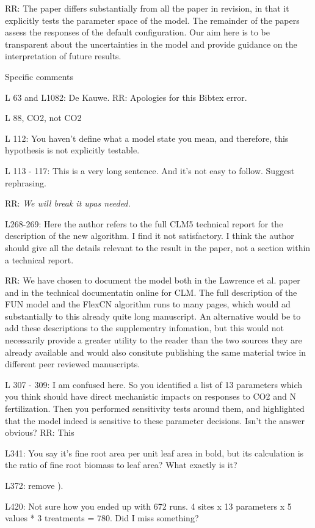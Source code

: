 \documentclass{article}
\begin{document}
RR: The paper differs substantially from all the paper in revision, in that it explicitly tests the parameter space of the model.  The remainder of the papers assess the responses of the default configuration. Our aim here is to be transparent about the uncertainties in the model and provide guidance on the interpretation of future results. 

Specific comments 

L 63 and L1082: De Kauwe. 
RR: Apologies for this Bibtex error. 

L 88, CO2, not CO2 

L 112: You haven't define what a model state you mean, and therefore, this hypothesis is not explicitly testable. 

L 113 - 117: This is a very long sentence. And it's not easy to follow. Suggest rephrasing.

RR:\emph{ We will break it upas needed. }

L268-269: Here the author refers to the full CLM5 technical report for the description of the new algorithm. I find it not satisfactory. I think the author should give all the details relevant to the result in the paper, not a section within a technical report. 

RR: We have chosen to document the model both in the Lawrence et al. paper and in the technical documentatin online for CLM. The full description of the FUN model and the FlexCN algorithm runs to many pages, which would ad substantially to this already quite long manuscript. An alternative would be to add these descriptions to the supplementry infomation, but this would not necessarily provide a greater utility to the reader than the two sources they are already available and would also consitute publishing the same material twice in different peer reviewed manuscripts. 

L 307 - 309: I am confused here. So you identified a list of 13 parameters which you think should have direct mechanistic impacts on responses to CO2 and N fertilization. Then you performed sensitivity tests around them, and highlighted that the model indeed is sensitive to these parameter decisions. Isn't the answer obvious? 
RR: This 

L341: You say it's fine root area per unit leaf area in bold, but its calculation is the ratio of fine root biomass to leaf area? What exactly is it? 

L372: remove ). 

L420: Not sure how you ended up with 672 runs. 4 sites x 13 parameters x 5 values * 3 treatments = 780. Did I miss something? 
\end{document}
